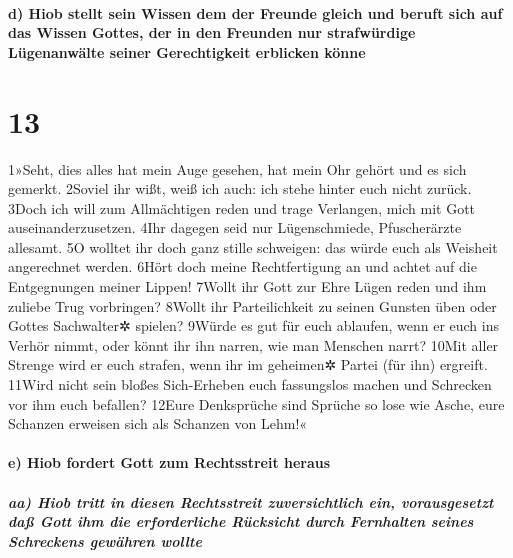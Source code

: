 \hypertarget{d-hiob-stellt-sein-wissen-dem-der-freunde-gleich-und-beruft-sich-auf-das-wissen-gottes-der-in-den-freunden-nur-strafwuxfcrdige-luxfcgenanwuxe4lte-seiner-gerechtigkeit-erblicken-kuxf6nne}{%
\paragraph{d) Hiob stellt sein Wissen dem der Freunde gleich und beruft
sich auf das Wissen Gottes, der in den Freunden nur strafwürdige
Lügenanwälte seiner Gerechtigkeit erblicken
könne}\label{d-hiob-stellt-sein-wissen-dem-der-freunde-gleich-und-beruft-sich-auf-das-wissen-gottes-der-in-den-freunden-nur-strafwuxfcrdige-luxfcgenanwuxe4lte-seiner-gerechtigkeit-erblicken-kuxf6nne}}

\hypertarget{section-12}{%
\section{13}\label{section-12}}

1»Seht, dies alles hat mein Auge gesehen, hat mein Ohr gehört und es
sich gemerkt. 2Soviel ihr wißt, weiß ich auch: ich stehe hinter euch
nicht zurück. 3Doch ich will zum Allmächtigen reden und trage Verlangen,
mich mit Gott auseinanderzusetzen. 4Ihr dagegen seid nur Lügenschmiede,
Pfuscherärzte allesamt. 5O wolltet ihr doch ganz stille schweigen: das
würde euch als Weisheit angerechnet werden. 6Hört doch meine
Rechtfertigung an und achtet auf die Entgegnungen meiner Lippen! 7Wollt
ihr Gott zur Ehre Lügen reden und ihm zuliebe Trug vorbringen? 8Wollt
ihr Parteilichkeit zu seinen Gunsten üben oder Gottes Sachwalter✲
spielen? 9Würde es gut für euch ablaufen, wenn er euch ins Verhör nimmt,
oder könnt ihr ihn narren, wie man Menschen narrt? 10Mit aller Strenge
wird er euch strafen, wenn ihr im geheimen✲ Partei (für ihn) ergreift.
11Wird nicht sein bloßes Sich-Erheben euch fassungslos machen und
Schrecken vor ihm euch befallen? 12Eure Denksprüche sind Sprüche so lose
wie Asche, eure Schanzen erweisen sich als Schanzen von Lehm!«

\hypertarget{e-hiob-fordert-gott-zum-rechtsstreit-heraus}{%
\paragraph{e) Hiob fordert Gott zum Rechtsstreit
heraus}\label{e-hiob-fordert-gott-zum-rechtsstreit-heraus}}

\hypertarget{aa-hiob-tritt-in-diesen-rechtsstreit-zuversichtlich-ein-vorausgesetzt-dauxdf-gott-ihm-die-erforderliche-ruxfccksicht-durch-fernhalten-seines-schreckens-gewuxe4hren-wollte}{%
\subparagraph{aa) Hiob tritt in diesen Rechtsstreit zuversichtlich ein,
vorausgesetzt daß Gott ihm die erforderliche Rücksicht durch Fernhalten
seines Schreckens gewähren
wollte}\label{aa-hiob-tritt-in-diesen-rechtsstreit-zuversichtlich-ein-vorausgesetzt-dauxdf-gott-ihm-die-erforderliche-ruxfccksicht-durch-fernhalten-seines-schreckens-gewuxe4hren-wollte}}

